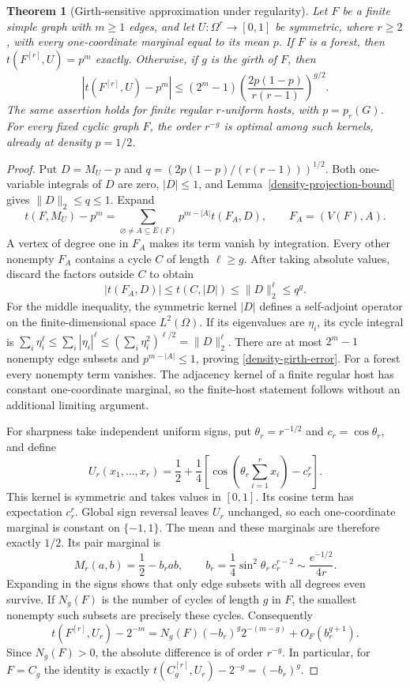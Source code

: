 \documentclass[a4paper,11pt,reqno]{amsart}
\theoremstyle{plain}
\newtheorem{theorem}{Theorem}[section]
\theoremstyle{definition}
\theoremstyle{remark}
\begin{document}
\begin{theorem}[Girth-sensitive approximation under regularity]
\label{density-regular-girth}
Let $F$ be a finite simple graph with $m\ge1$ edges, and let
$U:\Omega^r\to[0,1]$ be symmetric, where $r\ge2$, with every
one-coordinate marginal equal to its mean $p$.
If $F$ is a forest, then $t(F^{[r]},U)=p^m$ exactly.
Otherwise, if $g$ is the girth of $F$, then
\begin{equation}\label{density-girth-error}
 \left|t(F^{[r]},U)-p^m\right|
 \le (2^m-1)
       \left(\frac{2p(1-p)}{r(r-1)}\right)^{g/2}.
\end{equation}
The same assertion holds for finite regular $r$-uniform hosts,
with $p=p_r(G)$.  For every fixed cyclic graph $F$, the order
$r^{-g}$ is optimal among such kernels, already at density $p=1/2$.
\end{theorem}
\begin{proof}
Put $D=M_U-p$ and
$q=(2p(1-p)/(r(r-1)))^{1/2}$.  Both one-variable integrals of $D$
are zero, $|D|\le1$, and Lemma~\ref{density-projection-bound}
gives $\|D\|_2\le q\le1$.  Expand
\[
 t(F,M_U)-p^m
  =\sum_{\varnothing\ne A\subseteq E(F)}
       p^{m-|A|}t(F_A,D),\qquad F_A=(V(F),A).
\]
A vertex of degree one in $F_A$ makes its term vanish by integration.
Every other nonempty $F_A$ contains a cycle $C$ of length
$\ell\ge g$.  After taking absolute values, discard the factors
outside $C$ to obtain
\[
 |t(F_A,D)|\le t(C,|D|)\le\|D\|_2^\ell\le q^g.
\]
For the middle inequality, the symmetric kernel $|D|$ defines a
self-adjoint operator on the finite-dimensional space $L^2(\Omega)$.
If its eigenvalues are $\eta_i$, its cycle integral is
$\sum_i\eta_i^\ell\le\sum_i|\eta_i|^\ell
\le(\sum_i\eta_i^2)^{\ell/2}=\|D\|_2^\ell$.
There are at most $2^m-1$ nonempty edge subsets and
$p^{m-|A|}\le1$, proving \eqref{density-girth-error}.
For a forest every nonempty term vanishes.
The adjacency kernel of a finite regular host has constant
one-coordinate marginal, so the finite-host statement follows
without an additional limiting argument.

For sharpness take independent uniform signs, put
$\theta_r=r^{-1/2}$ and $c_r=\cos\theta_r$, and define
\[
 U_r(x_1,\ldots,x_r)
  =\frac12+\frac14\left[
       \cos\!\left(\theta_r\sum_{i=1}^r x_i\right)-c_r^r
     \right].
\]
This kernel is symmetric and takes values in $[0,1]$.
Its cosine term has expectation $c_r^r$.
Global sign reversal leaves $U_r$ unchanged, so each one-coordinate
marginal is constant on $\{-1,1\}$.  The mean and these marginals
are therefore exactly $1/2$.
Its pair marginal is
\[
 M_r(a,b)=\frac12-b_rab,\qquad
 b_r=\frac14\sin^2\theta_r\,c_r^{r-2}
       \sim\frac{e^{-1/2}}{4r}.
\]
Expanding in the signs shows that only edge subsets with all
degrees even survive.  If $N_g(F)$ is the number of cycles of
length $g$ in $F$, the smallest nonempty such subsets are precisely
these cycles.  Consequently
\[
 t(F^{[r]},U_r)-2^{-m}
  =N_g(F)(-b_r)^g2^{-(m-g)}+O_F(b_r^{g+1}).
\]
Since $N_g(F)>0$, the absolute difference is of order $r^{-g}$.
In particular, for $F=C_g$ the identity is exactly
$t(C_g^{[r]},U_r)-2^{-g}=(-b_r)^g$.
\end{proof}
\end{document}
